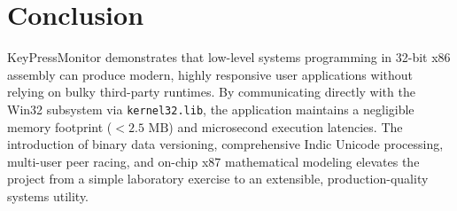 \documentclass[11pt,a4paper]{article}
\begin{document}
\section{Conclusion}
KeyPressMonitor demonstrates that low-level systems programming in 32-bit x86 assembly can produce modern, highly responsive user applications without relying on bulky third-party runtimes. By communicating directly with the Win32 subsystem via \texttt{kernel32.lib}, the application maintains a negligible memory footprint ($< 2.5\text{ MB}$) and microsecond execution latencies. The introduction of binary data versioning, comprehensive Indic Unicode processing, multi-user peer racing, and on-chip x87 mathematical modeling elevates the project from a simple laboratory exercise to an extensible, production-quality systems utility.
\end{document}

